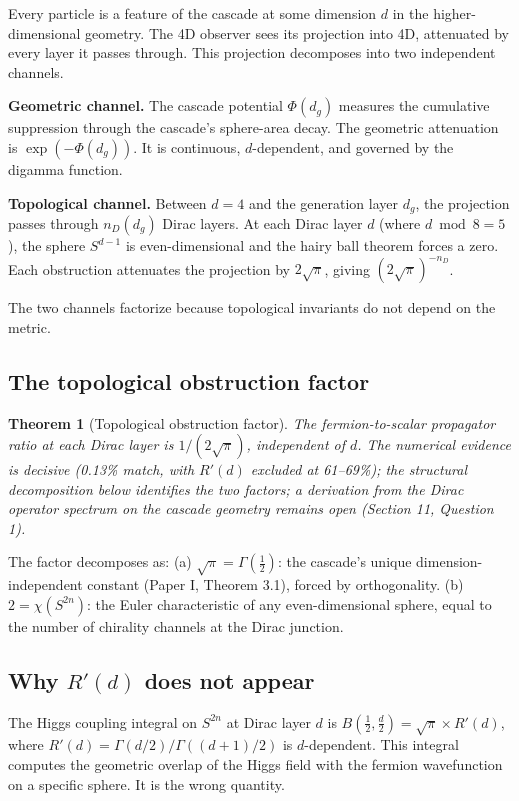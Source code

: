 \documentclass[12pt,a4paper]{article}
\newtheorem{theorem}{Theorem}[section]
\begin{document}
Every particle is a feature of the cascade at some dimension $d$ in the higher-dimensional geometry. The 4D observer sees its projection into 4D, attenuated by every layer it passes through. This projection decomposes into two independent channels.

\textbf{Geometric channel.} The cascade potential $\Phi(d_g)$ measures the cumulative suppression through the cascade's sphere-area decay. The geometric attenuation is $\exp(-\Phi(d_g))$. It is continuous, $d$-dependent, and governed by the digamma function.

\textbf{Topological channel.} Between $d = 4$ and the generation layer $d_g$, the projection passes through $n_D(d_g)$ Dirac layers. At each Dirac layer $d$ (where $d \bmod 8 = 5$), the sphere $S^{d-1}$ is even-dimensional and the hairy ball theorem forces a zero. Each obstruction attenuates the projection by $2\sqrt{\pi}$, giving $(2\sqrt{\pi})^{-n_D}$.

The two channels factorize because topological invariants do not depend on the metric.

\subsection{The topological obstruction factor}

\begin{theorem}[Topological obstruction factor]
The fermion-to-scalar propagator ratio at each Dirac layer is $1/(2\sqrt{\pi})$, independent of $d$. The numerical evidence is decisive (0.13\% match, with $R'(d)$ excluded at 61--69\%); the structural decomposition below identifies the two factors; a derivation from the Dirac operator spectrum on the cascade geometry remains open (Section 11, Question 1).
\end{theorem}

The factor decomposes as: (a) $\sqrt{\pi} = \Gamma(\tfrac{1}{2})$: the cascade's unique dimension-independent constant (Paper I, Theorem 3.1), forced by orthogonality. (b) $2 = \chi(S^{2n})$: the Euler characteristic of any even-dimensional sphere, equal to the number of chirality channels at the Dirac junction.

\subsection{Why $R'(d)$ does not appear}

The Higgs coupling integral on $S^{2n}$ at Dirac layer $d$ is $B(\tfrac{1}{2}, \tfrac{d}{2}) = \sqrt{\pi} \times R'(d)$, where $R'(d) = \Gamma(d/2)/\Gamma((d+1)/2)$ is $d$-dependent. This integral computes the geometric overlap of the Higgs field with the fermion wavefunction on a specific sphere. It is the wrong quantity.
\end{document}
